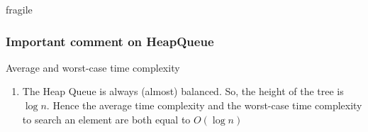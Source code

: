 \documentclass{beamer}
\begin{document}
\begin{frame}{fragile}
\frametitle{Important comment on HeapQueue}
\begin{block}{Average and worst-case time complexity}
\begin{enumerate}
\item The Heap Queue is always (almost) balanced. So, the height of the tree is $\log n$. Hence the  average time complexity and the worst-case time complexity to search an element are both equal to $O(\log n)$
\end{enumerate}
\end{block}

\end{frame}
\end{document}
